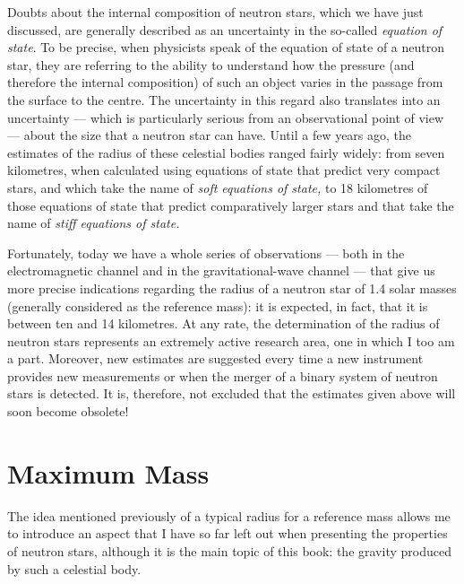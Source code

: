 Doubts about the internal composition of neutron stars, which we have just discussed,
are generally described as an uncertainty in the so-called \emph{equation of state}. To
be precise, when physicists speak of the equation of state of a
neutron star, they are referring to the ability to understand how the pressure (and
therefore the internal composition) of such an object varies in the passage from the
surface to the centre. The uncertainty in this regard also translates into an
uncertainty --- which is particularly serious from an observational point of view ---
about the size that a neutron star can have. Until a few years ago, the estimates of the
radius of these celestial bodies ranged fairly widely: from seven kilometres, when
calculated using equations of state that predict very compact stars, and which take the
name of \emph{soft equations of state}\emph{,} to
18 kilometres of those equations of state that predict comparatively larger stars and
that take the name of \emph{stiff equations of state}\emph{.}

Fortunately, today we have a whole series of observations --- both in the
electromagnetic channel and in the gravitational-wave channel --- that give us more
precise indications regarding the radius of a neutron star of 1.4 solar masses
(generally considered as the reference mass): it is expected, in fact, that it is
between ten and 14 kilometres. At any rate, the determination of the radius of neutron
stars represents an extremely active research area, one in which I too am a part.
Moreover, new estimates are suggested every time a new instrument provides new
measurements or when the merger of a binary system of neutron stars is detected. It is,
therefore, not excluded that the estimates given above will soon become obsolete!

\section{Maximum Mass}\label{sec:05-mass}

The idea mentioned previously of a typical radius for a reference mass allows me to
introduce an aspect that I have so far left out when presenting the properties of
neutron stars, although it is the main topic of this book: the gravity produced by such
a celestial body.

